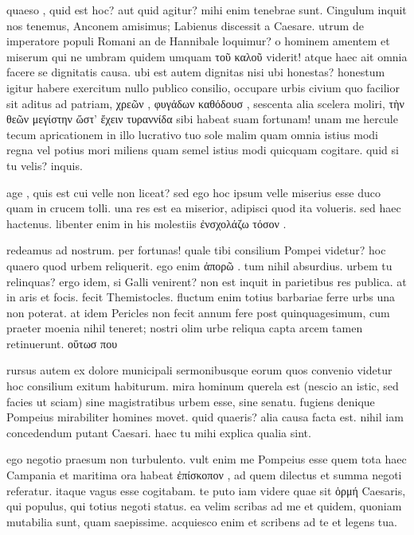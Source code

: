 


 quaeso , quid est hoc? aut quid agitur? mihi enim tenebrae sunt. Cingulum inquit nos tenemus, Anconem amisimus; Labienus discessit a Caesare. utrum de imperatore populi Romani an de Hannibale loquimur? o hominem amentem et miserum qui ne umbram quidem umquam τοῦ καλοῦ viderit! atque haec ait omnia facere se dignitatis causa. ubi est autem dignitas nisi ubi honestas? honestum igitur habere exercitum nullo publico consilio, occupare urbis civium quo facilior sit aditus ad patriam, χρεῶν , φυγάδων καθόδουσ , sescenta alia scelera moliri, τὴν θεῶν μεγίστην ὥστ' ἔχειν τυραννίδα sibi habeat suam fortunam! unam me hercule tecum apricationem in illo lucrativo tuo sole malim quam omnia istius modi regna vel potius mori miliens quam semel istius modi quicquam cogitare. quid si tu velis? inquis.

 age , quis est cui velle non liceat? sed ego hoc ipsum velle miserius esse duco quam in crucem tolli. una res est ea miserior, adipisci quod ita volueris. sed haec hactenus. libenter enim in his molestiis ἐνσχολάζω τόσον .

 redeamus ad nostrum. per fortunas! quale tibi consilium Pompei videtur? hoc quaero quod urbem reliquerit. ego enim ἀπορῶ . tum nihil absurdius. urbem tu relinquas? ergo idem, si Galli venirent? non est inquit in parietibus res publica. at in aris et focis. fecit Themistocles. fluctum enim totius barbariae ferre urbs una non poterat. at idem Pericles non fecit annum fere post quinquagesimum, cum praeter moenia nihil teneret; nostri olim urbe reliqua capta arcem tamen retinuerunt. οὕτωσ που

 rursus autem ex dolore municipali sermonibusque eorum quos convenio videtur hoc consilium exitum habiturum. mira hominum querela est (nescio an istic, sed facies ut sciam) sine magistratibus urbem esse, sine senatu. fugiens denique Pompeius mirabiliter homines movet. quid quaeris? alia causa facta est. nihil iam concedendum putant Caesari. haec tu mihi explica qualia sint.

 ego negotio praesum non turbulento. vult enim me Pompeius esse quem tota haec Campania et maritima ora habeat ἐπίσκοπον , ad quem dilectus et summa negoti referatur. itaque vagus esse cogitabam. te puto iam videre quae sit ὁρμή Caesaris, qui populus, qui totius negoti status. ea velim scribas ad me et quidem, quoniam mutabilia sunt, quam saepissime. acquiesco enim et scribens ad te et legens tua.
